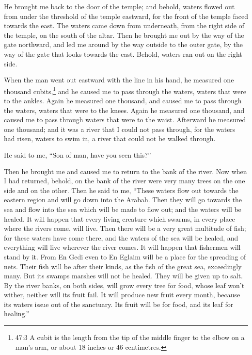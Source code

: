  He brought me back to the door of the temple; and behold,
waters flowed out from under the threshold of the temple eastward, for
the front of the temple faced towards the east. The waters came down
from underneath, from the right side of the temple, on the south of the
altar.  Then he brought me out by the way of the gate
northward, and led me around by the way outside to the outer gate, by
the way of the gate that looks towards the east. Behold, waters ran out
on the right side.

 When the man went out eastward with the line in his hand,
he measured one thousand cubits,\footnote{47:3 A cubit is the length
  from the tip of the middle finger to the elbow on a man's arm, or
  about 18 inches or 46 centimetres.} and he caused me to pass through
the waters, waters that were to the ankles.  Again he
measured one thousand, and caused me to pass through the waters, waters
that were to the knees. Again he measured one thousand, and caused me to
pass through waters that were to the waist.  Afterward he
measured one thousand; and it was a river that I could not pass through,
for the waters had risen, waters to swim in, a river that could not be
walked through.

 He said to me, ``Son of man, have you seen this?''

Then he brought me and caused me to return to the bank of the river.
 Now when I had returned, behold, on the bank of the river
were very many trees on the one side and on the other.  Then
he said to me, ``These waters flow out towards the eastern region and
will go down into the Arabah. Then they will go towards the sea and flow
into the sea which will be made to flow out; and the waters will be
healed.  It will happen that every living creature which
swarms, in every place where the rivers come, will live. Then there will
be a very great multitude of fish; for these waters have come there, and
the waters of the sea will be healed, and everything will live wherever
the river comes.  It will happen that fishermen will stand
by it. From En Gedi even to En Eglaim will be a place for the spreading
of nets. Their fish will be after their kinds, as the fish of the great
sea, exceedingly many.  But its swamps marshes will not be
healed. They will be given up to salt.  By the river banks,
on both sides, will grow every tree for food, whose leaf won't wither,
neither will its fruit fail. It will produce new fruit every month,
because its waters issue out of the sanctuary. Its fruit will be for
food, and its leaf for healing.''


